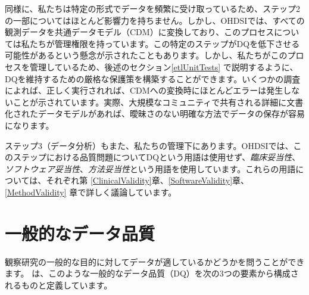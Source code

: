 \documentclass[
  11pt]{book}
\theoremstyle{definition}
\theoremstyle{definition}
\theoremstyle{definition}
\theoremstyle{definition}
\theoremstyle{remark}
\begin{document}
同様に、私たちは特定の形式でデータを頻繁に受け取っているため、ステップ2の一部についてはほとんど影響力を持ちません。しかし、OHDSIでは、すべての観測データを共通データモデル（CDM）に変換しており、このプロセスについては私たちが管理権限を持っています。この特定のステップがDQを低下させる可能性があるという懸念が示されたこともあります。しかし、私たちがこのプロセスを管理しているため、後述のセクション\ref{etlUnitTests} で説明するように、DQを維持するための厳格な保護策を構築することができます。いくつかの調査\citep{defalco_2013, makadia_2014, matcho_2014, voss_2015, voss_2015b, hripcsak_2018} によれば、正しく実行されれば、CDMへの変換時にほとんどエラーは発生しないことが示されています。実際、大規模なコミュニティで共有される詳細に文書化されたデータモデルがあれば、曖昧さのない明確な方法でデータの保存が容易になります。

ステップ3（データ分析）もまた、私たちの管理下にあります。OHDSIでは、このステップにおける品質問題についてDQという用語は使用せず、\emph{臨床妥当性}、\emph{ソフトウェア妥当性}、\emph{方法妥当性}という用語を使用しています。これらの用語については、それぞれ第 \ref{ClinicalValidity}章、\ref{SoftwareValidity}章、\ref{MethodValidity} 章で詳しく議論しています。

\section{一般的なデータ品質}\label{ux4e00ux822cux7684ux306aux30c7ux30fcux30bfux54c1ux8cea}

観察研究の一般的な目的に対してデータが適しているかどうかを問うことができます。\citet{kahn_harmonized_2016} は、このような一般的なデータ品質（DQ）を次の3つの要素から構成されるものと定義しています。
\end{document}
